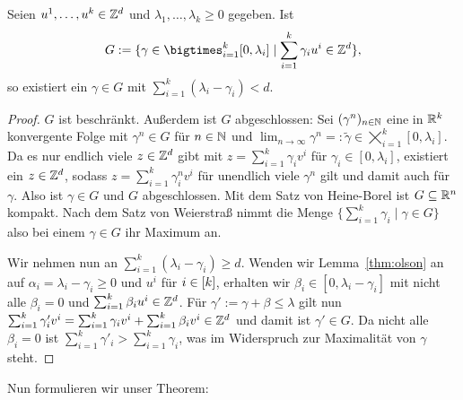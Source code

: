 \begin{lemma}\label{lem:maxgamma}
	Seien $u^1,\dots,u^k\in\mathbb{Z}^d$ und $\lambda_1,\dots,\lambda_k\geq0$ gegeben.
	Ist 
	$$G:=\{\gamma \in \bigtimes_{i=1}^k [0,\lambda_i] \mid \sum_{i=1}^k \gamma_i u^i\in\Z^d \},$$
	so existiert ein $\gamma\in G$ mit $\sum_{i=1}^k(\lambda_i-\gamma_i)<d$.
\end{lemma}
\begin{proof}
	$G$ ist beschränkt. Außerdem ist $G$ abgeschlossen: Sei $(\gamma^n)_{n\in\mathbb{N}}$ eine in $\mathbb{R}^k$ konvergente Folge mit $\gamma^n\in G$ für $n\in\mathbb{N}$ und $\lim_{n\to\infty}\gamma^n=:\tilde{\gamma}\in\bigtimes_{i=1}^k [0,\lambda_i]$.
	Da es nur endlich viele $z\in\mathbb{Z}^d$ gibt mit $z=\sum_{i=1}^k\gamma_iv^i$ für $\gamma_i\in[0,\lambda_i]$, existiert ein $z\in\mathbb{Z}^d$, sodass $z=\sum_{i=1}^k\gamma^n_iv^i$ für unendlich viele $\gamma^n$ gilt und damit auch für $\gamma$.
	Also ist $\gamma\in G$ und $G$ abgeschlossen.
	Mit dem Satz von Heine-Borel ist $G\subseteq\mathbb{R}^n$ kompakt.
	Nach dem Satz von Weierstraß nimmt die Menge $\{ \sum_{i=1}^k\gamma_i \mid \gamma\in G \}$ also bei einem $\gamma\in G$ ihr Maximum an.
	
	Wir nehmen nun an $\sum_{i=1}^k(\lambda_i - \gamma_i) \geq d$.
	Wenden wir Lemma~\ref{thm:olson} an auf $\alpha_i=\lambda_i-\gamma_i\geq0$ und $u^i$ für $i\in[k]$, erhalten wir $\beta_i\in[0,\lambda_i-\gamma_i]$ mit nicht alle $\beta_i=0$ und $\sum_{i=1}^k \beta_i u^i\in\mathbb{Z}^d$.
	Für $\gamma':=\gamma+\beta\leq\lambda$ gilt nun 
	$
	\sum_{i=1}^k\gamma'_iv^i = \sum_{i=1}^k\gamma_iv^i + \sum_{i=1}^k \beta_iv^i\in\mathbb{Z}^d
	$
	und damit ist $\gamma'\in G$.
	Da nicht alle $\beta_i=0$ ist $\sum_{i=1}^k\gamma'_i > \sum_{i=1}^k\gamma_i$, was im Widerspruch zur Maximalität von $\gamma$ steht.
\end{proof}
Nun formulieren wir unser Theorem:

